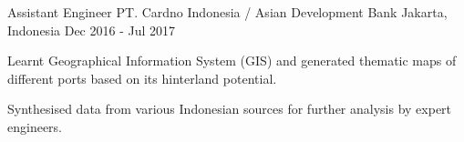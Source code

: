

\begin{cventries}

  \cventry
    {Assistant Engineer} %
    {PT. Cardno Indonesia / Asian Development Bank} %
    {Jakarta, Indonesia} %
    {Dec 2016 - Jul 2017} %
    {
      \begin{cvitems} %
        \item {Learnt Geographical Information System (GIS) and generated thematic maps of different ports based on its hinterland potential.}
        \item {Synthesised data from various Indonesian sources for further analysis by expert engineers.}
      \end{cvitems}
    }


\end{cventries}
